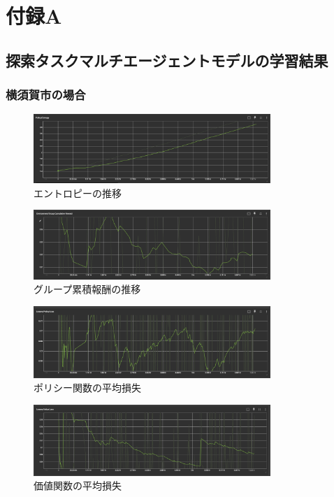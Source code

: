 \appendix
\chapter*{付録A}
\section{探索タスクマルチエージェントモデルの学習結果}
\subsection{横須賀市の場合}
\begin{figure}[H] 
  \centering 
  \includegraphics[width=0.8\textwidth]{Figures/App-YokosukaSearchEntropy.png}
  \caption{エントロピーの推移} 
  \label{fig:fig-01}
\end{figure}
\begin{figure}[H] 
  \centering 
  \includegraphics[width=0.8\textwidth]{Figures/App-YokosukaSearchGroupRward.png}
  \caption{グループ累積報酬の推移} 
  \label{fig:fig-01}
\end{figure}
\begin{figure}[H] 
  \centering 
  \includegraphics[width=0.8\textwidth]{Figures/YokosukaSearch-PolicyLoss.png}
  \caption{ポリシー関数の平均損失} 
  \label{fig:fig-01}
\end{figure}
\begin{figure}[H] 
  \centering 
  \includegraphics[width=0.8\textwidth]{Figures/App-YokosukaSearchVlueLoss.png}
  \caption{価値関数の平均損失} 
  \label{fig:fig-01}
\end{figure}



